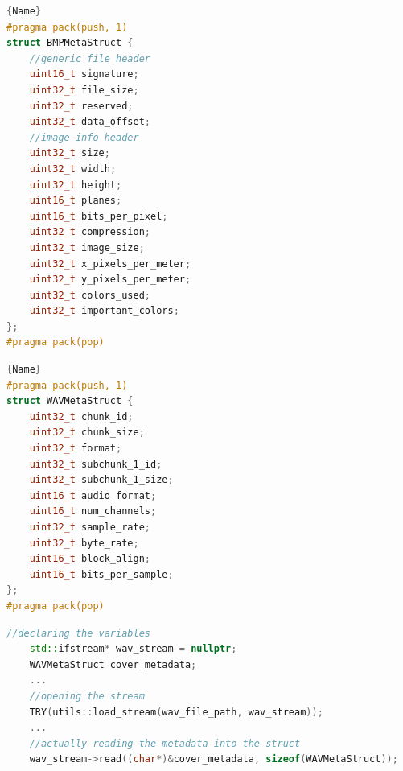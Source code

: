\begin{minipage}{.35\textwidth}
\begin{lstlisting}[language=C++,caption=BMP header structure,frame=tlrb,label=lst:cppstruct1]{Name}
#pragma pack(push, 1)
struct BMPMetaStruct {
	//generic file header
	uint16_t signature;
	uint32_t file_size;
	uint32_t reserved;
	uint32_t data_offset;
	//image info header
	uint32_t size;
	uint32_t width;
	uint32_t height;
	uint16_t planes;
	uint16_t bits_per_pixel;
	uint32_t compression;
	uint32_t image_size;
	uint32_t x_pixels_per_meter;
	uint32_t y_pixels_per_meter;
	uint32_t colors_used;
	uint32_t important_colors;
};
#pragma pack(pop)
\end{lstlisting}
\end{minipage}\hfill
\begin{minipage}{.35\textwidth}
\begin{lstlisting}[language=C++,caption=WAV metadata struct,frame=tlrb,label=lst:cppstruct2]{Name}
#pragma pack(push, 1)
struct WAVMetaStruct {
	uint32_t chunk_id;
	uint32_t chunk_size;
	uint32_t format;
	uint32_t subchunk_1_id;
	uint32_t subchunk_1_size;
	uint16_t audio_format;
	uint16_t num_channels;
	uint32_t sample_rate;
	uint32_t byte_rate;
	uint16_t block_align;
	uint16_t bits_per_sample;
};
#pragma pack(pop)
\end{lstlisting}
\end{minipage}

\begin{lstlisting}[language=C++,caption=Reading file data directly into custom structure,label={cppstruct_reading_ex}]
	//declaring the variables
	std::ifstream* wav_stream = nullptr;
	WAVMetaStruct cover_metadata;
	...
	//opening the stream
	TRY(utils::load_stream(wav_file_path, wav_stream));
	...
	//actually reading the metadata into the struct
	wav_stream->read((char*)&cover_metadata, sizeof(WAVMetaStruct));
\end{lstlisting}


